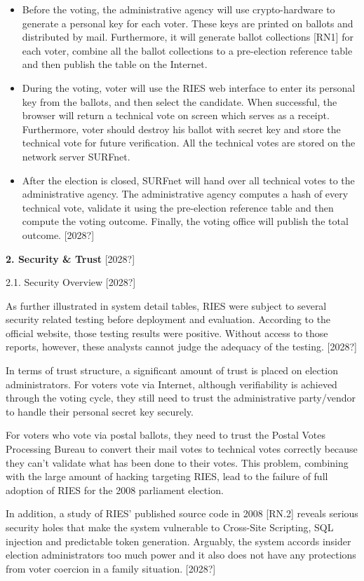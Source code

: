 \begin{itemize}
\item Before the voting, the administrative agency will use crypto-hardware to generate a personal key for each voter. These keys are printed on ballots and distributed by mail. Furthermore, it will generate ballot collections [RN1] for each voter, combine all the ballot collections to a pre-election reference table and then publish the table on the Internet.
\item During the voting, voter will use the RIES web interface to enter its personal key from the ballots, and then select the candidate. When successful, the browser will return a technical vote on screen which serves as a receipt. Furthermore, voter should destroy his ballot with secret key and store the technical vote for future verification. All the technical votes are stored on the network server SURFnet.
\item After the election is closed, SURFnet will hand over all technical votes to the administrative agency. The administrative agency computes a hash of every technical vote, validate it using the pre-election reference table and then compute the voting outcome. Finally, the voting office will publish the total outcome. [2028?]
\end{itemize}
\textbf{2. Security \& Trust }[2028?]

2.1. Security Overview [2028?]

As further illustrated in system detail tables, RIES were subject to several security related testing before deployment and evaluation. According to the official website, those testing results were positive. Without access to those reports, however, these analysts cannot judge the adequacy of the testing. [2028?]

In terms of trust structure, a significant amount of trust is placed on election administrators. For voters vote via Internet, although verifiability is achieved through the voting cycle, they still need to trust the administrative party/vendor to handle their personal secret key securely.

For voters who vote via postal ballots, they need to trust the Postal Votes Processing Bureau to convert their mail votes to technical votes correctly because they can't validate what has been done to their votes. This problem, combining with the large amount of hacking targeting RIES, lead to the failure of full adoption of RIES for the 2008 parliament election.

In addition, a study of RIES' published source code in 2008 [RN.2] reveals serious security holes that make the system vulnerable to Cross-Site Scripting, SQL injection and predictable token generation. Arguably, the system accords insider election administrators too much power and it also does not have any protections from voter coercion in a family situation. [2028?]

